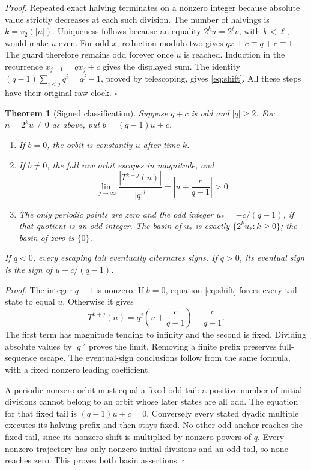 \documentclass[11pt,letterpaper]{article}
\newtheorem{theorem}{Theorem}
\newenvironment{proof}{\noindent\textit{Proof.}}{\hfill\(\square\)}
\begin{document}
\begin{proof}
Repeated exact halving terminates on a nonzero integer because absolute
value strictly decreases at each such division. The number of halvings is
\(k=v_2(|n|)\). Uniqueness follows because an equality
\(2^k u=2^\ell v\), with \(k<\ell\), would make \(u\) even.
For odd \(x\), reduction modulo two gives \(qx+c\equiv q+c\equiv1\).
The guard therefore remains odd forever once \(u\) is reached.
Induction in the recurrence \(x_{j+1}=qx_j+c\) gives the displayed sum.
The identity \((q-1)\sum_{i<j}q^i=q^j-1\), proved by telescoping,
gives \eqref{eq:shift}. All these steps have their original raw clock.
\end{proof}

\begin{theorem}[Signed classification]
\label{thm:signed}
Suppose \(q+c\) is odd and \(|q|\ge2\). For \(n=2^k u\ne0\) as above,
put \(b=(q-1)u+c\).
\begin{enumerate}[label=(\roman*)]
\item If \(b=0\), the orbit is constantly \(u\) after time \(k\).
\item If \(b\ne0\), the full raw orbit escapes in magnitude, and
\[
\lim_{j\to\infty}\frac{|T^{k+j}(n)|}{|q|^j}
=\left|u+\frac{c}{q-1}\right|>0.
\]
\item The only periodic points are zero and the odd integer
\(u_*=-c/(q-1)\), if that quotient is an odd integer.
The basin of \(u_*\) is exactly
\(\{2^k u_*:k\ge0\}\); the basin of zero is \(\{0\}\).
\end{enumerate}
If \(q<0\), every escaping tail eventually alternates signs.
If \(q>0\), its eventual sign is the sign of \(u+c/(q-1)\).
\end{theorem}

\begin{proof}
The integer \(q-1\) is nonzero. If \(b=0\), equation \eqref{eq:shift}
forces every tail state to equal \(u\). Otherwise it gives
\[
T^{k+j}(n)=q^j\left(u+\frac{c}{q-1}\right)-\frac{c}{q-1}.
\]
The first term has magnitude tending to infinity and the second is fixed.
Dividing absolute values by \(|q|^j\) proves the limit. Removing a finite
prefix preserves full-sequence escape. The eventual-sign conclusions
follow from the same formula, with a fixed nonzero leading coefficient.

A periodic nonzero orbit must equal a fixed odd tail: a positive number
of initial divisions cannot belong to an orbit whose later states are
all odd. The equation for that fixed tail is \((q-1)u+c=0\).
Conversely every stated dyadic multiple executes its halving prefix and
then stays fixed. No other odd anchor reaches the fixed tail, since its
nonzero shift is multiplied by nonzero powers of \(q\).
Every nonzero trajectory has only nonzero initial divisions and an odd
tail, so none reaches zero. This proves both basin assertions.
\end{proof}
\end{document}
